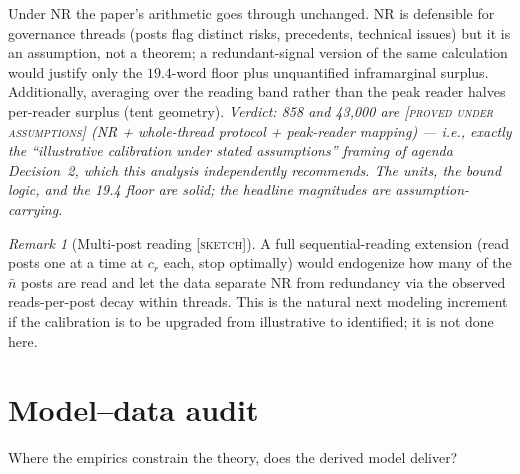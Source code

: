 \documentclass[11pt]{article}
\theoremstyle{remark}
\newtheorem{remark}{Remark}
\newcommand{\statusPA}{\textsc{[proved under assumptions]}}
\newcommand{\statusS}{\textsc{[sketch]}}
\begin{document}
Under NR the paper's arithmetic goes through unchanged. NR is defensible for
governance threads (posts flag distinct risks, precedents, technical issues)
but it is an assumption, not a theorem; a redundant-signal version of the same
calculation would justify only the $19.4$-word floor plus unquantified
inframarginal surplus. Additionally, averaging over the reading band rather
than the peak reader halves per-reader surplus (tent geometry). \emph{Verdict:
858 and 43{,}000 are \statusPA{} (NR + whole-thread protocol + peak-reader
mapping) --- i.e., exactly the ``illustrative calibration under stated
assumptions'' framing of agenda Decision~2, which this analysis independently
recommends. The units, the bound logic, and the 19.4 floor are solid; the
headline magnitudes are assumption-carrying.}

\begin{remark}[Multi-post reading \statusS]\label{rem:kpost}
A full sequential-reading extension (read posts one at a time at $c_r$ each,
stop optimally) would endogenize how many of the $\bar n$ posts are read and
let the data separate NR from redundancy via the observed reads-per-post decay
within threads. This is the natural next modeling increment if the calibration
is to be upgraded from illustrative to identified; it is not done here.
\end{remark}

\section{Model--data audit}
\label{sec:audit}

Where the empirics constrain the theory, does the derived model deliver?
\end{document}
